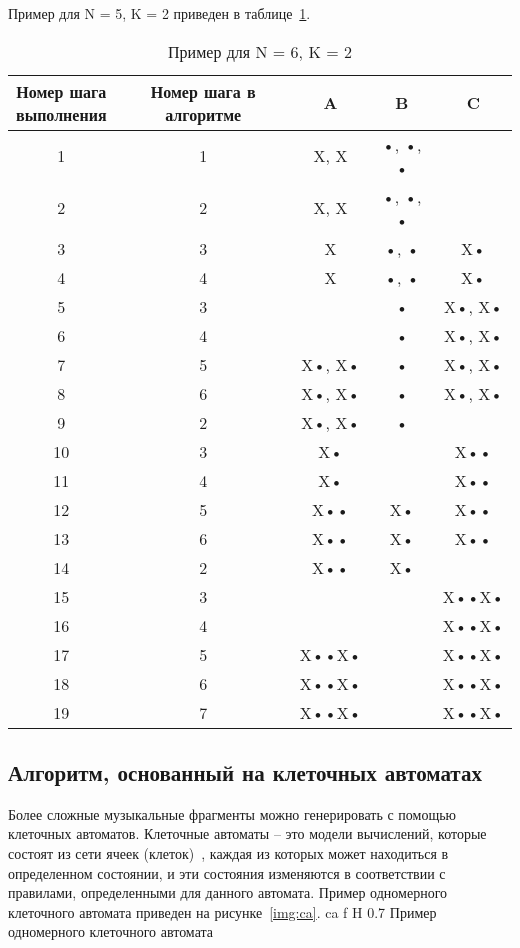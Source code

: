 Пример для N = 5, K = 2 приведен в таблице~\ref{tbl:ex2}.
\begin{table}[H]
	\caption{Пример для N = 6, K = 2}
	\label{tbl:ex2}
	\begin{tabular}{|c|c|c|c|c|}
		\hline
		\makecell{Номер шага \\ выполнения} & Номер шага в алгоритме & A & B & C \\
		\hline
		1 & 1 & X, X & •, •, • &  \\
		\hline
		2 & 2 & X, X & •, •, • &  \\
		\hline
		3 & 3 & X & •, • & X• \\
		\hline
		4 & 4 & X & •, • & X• \\
		\hline
		5 & 3 &  & • & X•, X• \\
		\hline
		6 & 4 &  & • & X•, X• \\
		\hline
		7 & 5 & X•, X• & • & X•, X• \\
		\hline
		8 & 6 & X•, X• & • & X•, X• \\
		\hline
		9 & 2 & X•, X• & • &  \\
		\hline
		10 & 3 & X• &  & X•• \\
		\hline
		11 & 4 & X• &  & X•• \\
		\hline
		12 & 5 & X•• & X• & X•• \\
		\hline
		13 & 6 & X•• & X• & X•• \\
		\hline
		14 & 2 & X•• & X• &  \\
		\hline
		15 & 3 &  &  & X••X• \\
		\hline
		16 & 4 &  &  & X••X• \\
		\hline
		17 & 5 & X••X• &  & X••X• \\
		\hline
		18 & 6 & X••X• &  & X••X• \\
		\hline
		19 & 7 & X••X• &  & X••X• \\
		\hline
	\end{tabular}
\end{table}

\subsection{Алгоритм, основанный на клеточных автоматах}
Более сложные музыкальные фрагменты можно генерировать с помощью клеточных автоматов. Клеточные автоматы -- это модели вычислений, которые состоят из сети ячеек (клеток)~\cite{man}, каждая из которых может находиться в определенном состоянии, и эти состояния изменяются в соответствии с правилами, определенными для данного автомата. Пример одномерного клеточного автомата приведен на рисунке~\ref{img:ca}. 
{ca}
{f}
{H}
{0.7\textwidth}
{Пример одномерного клеточного автомата}

